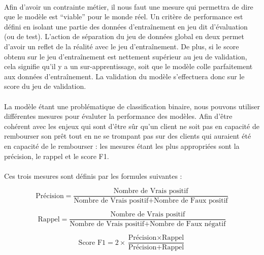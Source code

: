 \documentclass[10pt, french, a4paper]{report}
\begin{document}
\paragraph{}
Afin d'avoir un contrainte métier, il nous faut une mesure qui permettra de dire que le modèle est ``viable'' pour le monde réel. Un critère de performance est défini en isolant une partie des données d'entraînement en jeu dit d'évaluation (ou de test). L'action de séparation du jeu de données global en deux permet d'avoir un reflet de la réalité avec le jeu d'entraînement. De plus, si le score obtenu sur le jeu d'entraînement est nettement supérieur au jeu de validation, cela signifie qu'il y a un sur-apprentissage, soit que le modèle colle parfaitement aux données d'entraînement. La validation du modèle s'effectuera donc sur le score du jeu de validation.

\paragraph{}
La modèle étant une problématique de classification binaire, nous pouvons utiliser différentes mesures pour évaluter la performance des modèles. Afin d'être cohérent avec les enjeux qui sont d'être sûr qu'un client ne soit pas en capacité de rembourser son prêt tout en ne se trompant pas sur des clients qui auraient été en capacité de le rembourser : les mesures étant les plus appropriées sont la précision, le rappel et le score F1.

\paragraph{}
Ces trois mesures sont définis par les formules suivantes :

\begin{equation}
  \text{Précision} = \frac{\text{Nombre de Vrais positif}}{\text{Nombre de Vrais positif} + \text{Nombre de Faux positif}}
\end{equation}

\begin{equation}
  \text{Rappel} = \frac{\text{Nombre de Vrais positif}}{\text{Nombre de Vrais positif} + \text{Nombre de Faux négatif}}
\end{equation}

\begin{equation}
  \text{Score F1} = 2 \times \frac{\text{Précision} \times \text{Rappel}}{\text{Précision}+\text{Rappel}}
\end{equation}
\end{document}
